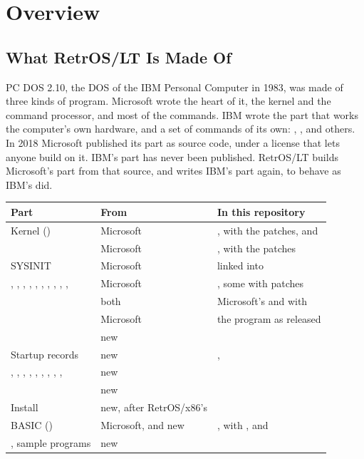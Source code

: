\mwnewpart
\renewcommand\runningtitle{Section 1. Overview}
\chapter{Overview}
\sectioncontents

\section{What RetrOS/LT Is Made Of}

\begin{plainwords}
PC DOS 2.10, the DOS of the IBM Personal Computer in 1983, was made of
three kinds of program. Microsoft wrote the heart of it, the kernel and
the command processor, and most of the commands. IBM wrote the part that
works the computer's own hardware, and a set of commands of its own:
, ,  and others. In 2018 Microsoft
published its part as source code, under a license that lets anyone build
on it. IBM's part has never been published. RetrOS/LT builds Microsoft's
part from that source, and writes IBM's part again, to behave as IBM's
did.
\end{plainwords}

\begin{tabularx}{\textwidth}{@{}P{1.6in}P{1.1in}Y@{}}
\toprule
\textbf{Part} & \textbf{From} & \textbf{In this repository}\\
\midrule
Kernel () & Microsoft & , with the
patches, and \\
 & Microsoft & , with the patches\\
SYSINIT & Microsoft & linked into \\
, , , , ,
, , , , ,
 & Microsoft & , some with patches\\
 & both & Microsoft's  and
 with \\
 & Microsoft & the program as released\\
 & new & \\
Startup records & new & , \\
, , , ,
, , , ,
,  & new & \\
 & new & \\
Install & new, after RetrOS/x86's & \\
BASIC () & Microsoft, and new & ,
with , and \\
, sample programs & new & \\
\bottomrule
\end{tabularx}

